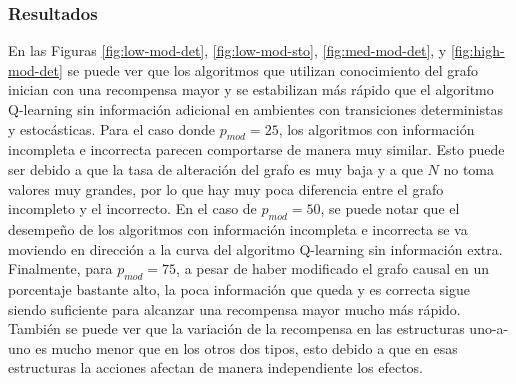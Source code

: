 \subsubsection{Resultados}

En las Figuras \ref{fig:low-mod-det}, \ref{fig:low-mod-sto}, \ref{fig:med-mod-det}, y \ref{fig:high-mod-det} se puede ver que los algoritmos que utilizan conocimiento del grafo inician con una recompensa mayor y se estabilizan más rápido que el algoritmo Q-learning
sin información adicional en ambientes con transiciones deterministas y estocásticas. Para el caso donde $p_{mod} = 25$, los algoritmos con información incompleta e incorrecta parecen 
comportarse de manera muy similar. Esto puede ser debido 
a que la tasa de alteración del grafo es muy baja y  a que $N$ no toma
valores muy grandes, por lo que hay muy poca diferencia entre el grafo incompleto y el incorrecto. 
En el caso de $p_{mod} = 50$, se
puede notar que el desempeño de los algoritmos
con información incompleta e incorrecta se 
va moviendo en dirección a la curva del algoritmo
Q-learning sin información extra.
Finalmente, para $p_{mod} = 75$,  a pesar de haber modificado el grafo 
causal en un porcentaje bastante alto, la poca información que queda y es correcta sigue siendo suficiente para alcanzar una recompensa mayor mucho más rápido.
También se puede ver que la variación de la 
recompensa en las estructuras uno-a-uno
es mucho menor que en los otros dos tipos, esto debido a que en esas estructuras la acciones afectan de manera independiente los efectos.


